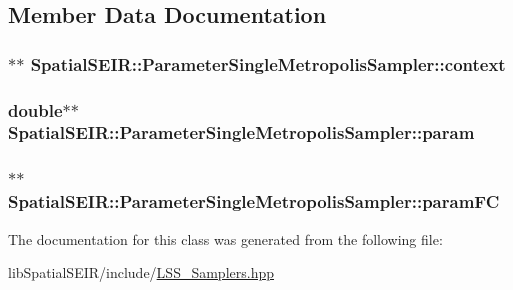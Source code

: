 \subsection{Member Data Documentation}
\hypertarget{classSpatialSEIR_1_1ParameterSingleMetropolisSampler_a4d66150fbe87614f62924200850ceb8d}{
\subsubsection[{context}]{$\ast$$\ast$ Spatial\-S\-E\-I\-R\-::\-Parameter\-Single\-Metropolis\-Sampler\-::context}}\label{classSpatialSEIR_1_1ParameterSingleMetropolisSampler_a4d66150fbe87614f62924200850ceb8d}
\hypertarget{classSpatialSEIR_1_1ParameterSingleMetropolisSampler_a285f57aeb99f88605992bf25c9f38afb}{
\subsubsection[{param}]{\setlength{\rightskip}{0pt plus 5cm}double$\ast$$\ast$ Spatial\-S\-E\-I\-R\-::\-Parameter\-Single\-Metropolis\-Sampler\-::param}}\label{classSpatialSEIR_1_1ParameterSingleMetropolisSampler_a285f57aeb99f88605992bf25c9f38afb}
\hypertarget{classSpatialSEIR_1_1ParameterSingleMetropolisSampler_afa10a884a3c6772dfca224f058293dfd}{
\subsubsection[{param\-F\-C}]{$\ast$$\ast$ Spatial\-S\-E\-I\-R\-::\-Parameter\-Single\-Metropolis\-Sampler\-::param\-F\-C}}\label{classSpatialSEIR_1_1ParameterSingleMetropolisSampler_afa10a884a3c6772dfca224f058293dfd}


The documentation for this class was generated from the following file\-:\begin{DoxyCompactItemize}
\item 
lib\-Spatial\-S\-E\-I\-R/include/\hyperlink{LSS__Samplers_8hpp}{L\-S\-S\-\_\-\-Samplers.\-hpp}\end{DoxyCompactItemize}
